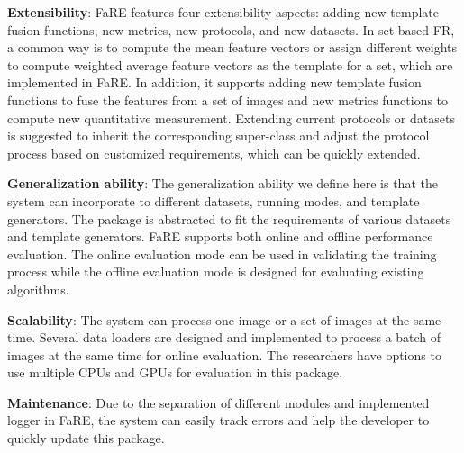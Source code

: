 \documentclass{article}
\begin{document}
\noindent \textbf{Extensibility}:
FaRE features four extensibility aspects: adding new template fusion functions, new metrics, new protocols, and new datasets.
In set-based FR, a common way is to compute the mean feature vectors or assign different weights to compute weighted average feature vectors as the template for a set, which are implemented in FaRE.
In addition, it supports adding new template fusion functions to fuse the features from a set of images and new metrics functions to compute new quantitative measurement.
Extending current protocols or datasets is suggested to inherit the corresponding super-class and adjust the protocol process based on customized requirements, which can be quickly extended.

\noindent \textbf{Generalization ability}:
The generalization ability we define here is that the system can incorporate to different datasets, running modes, and template generators.
The package is abstracted to fit the requirements of various datasets and template generators.
FaRE supports both online and offline performance evaluation.
The online evaluation mode can be used in validating the training process while the offline evaluation mode is designed for evaluating existing algorithms.

\noindent \textbf{Scalability}:
The system can process one image or a set of images at the same time.
Several data loaders are designed and implemented to process a batch of images at the same time for online evaluation.
The researchers have options to use multiple CPUs and GPUs for evaluation in this package.

\noindent \textbf{Maintenance}:
Due to the separation of different modules and implemented logger in FaRE, the system can easily track errors and help the developer to quickly update this package. 
\end{document}
